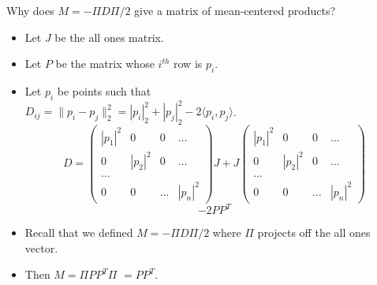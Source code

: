 \begin{frame}{Why does $M = -\Pi D \Pi/2$ give a matrix of
  mean-centered
  products?}
  \begin{itemize}[<+->]
   \item Let
   $J$ be the all ones matrix.
   \item Let $P$ be the matrix whose $i^{th}$ row is $p_i$.
   \item Let $p_i$ be points such that \\ $D_{ij} = \|p_i -
   p_j\|_2^2 = |p_i|_2^2 + |p_j|_2^2 - 2\langle p_i, p_j \rangle $.  
     \pause
   \[
   D = 
   \begin{pmatrix} |p_1|^2 & 0 & 0 & \ldots \\
     0 & |p_2|^2 & 0 &  \ldots \\
     \ldots \\
     0 & 0 & \ldots & |p_n|^2
     \end{pmatrix}  J
     + J 
   \begin{pmatrix} |p_1|^2 & 0 & 0 & \ldots \\
     0 & |p_2|^2 & 0 &  \ldots \\
     \ldots \\
     0 & 0 & \ldots & |p_n|^2
     \end{pmatrix}
       \]
       \[
     - 2PP^T
     \]
     \pause

     \item Recall that we defined $M = -\Pi D \Pi/2$ where $\Pi$
     projects off the all ones vector.
     \item Then $M = \Pi PP^T \Pi$ \pause $= PP^T$.
  \end{itemize}
\end{frame}

